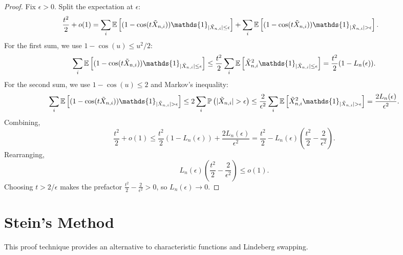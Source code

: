 \begin{proof}
	Fix $\epsilon > 0$. Split the expectation at $\epsilon$:
	\begin{align*}
		\frac{t^2}{2} + o(1)
		&= \sum_i \E\left[(1-\cos(t\tilde{X}_{n,i}))\mathds{1}_{|\tilde{X}_{n,i}|\le\epsilon}\right]
		+ \sum_i \E\left[(1-\cos(t\tilde{X}_{n,i}))\mathds{1}_{|\tilde{X}_{n,i}|>\epsilon}\right].
	\end{align*}
	For the first sum, we use $1-\cos(u) \le u^2/2$:
	\[
		\sum_i \E\left[(1-\cos(t\tilde{X}_{n,i}))\mathds{1}_{|\tilde{X}_{n,i}|\le\epsilon}\right] \le \frac{t^2}{2}\sum_i \E\left[\tilde{X}_{n,i}^2\mathds{1}_{|\tilde{X}_{n,i}|\le\epsilon}\right] = \frac{t^2}{2}(1-L_n(\epsilon)).
	\]
	For the second sum, we use $1 - \cos(u) \le 2$ and Markov's inequality:
	\[
		\sum_i \E\left[(1-\cos(t\tilde{X}_{n,i}))\mathds{1}_{|\tilde{X}_{n,i}|>\epsilon}\right] \le 2\sum_i \P\left(|\tilde{X}_{n,i}|>\epsilon\right) \le \frac{2}{\epsilon^2}\sum_i \E\left[\tilde{X}_{n,i}^2\mathds{1}_{|\tilde{X}_{n,i}|>\epsilon}\right] = \frac{2L_n(\epsilon)}{\epsilon^2}.
	\]
	Combining,
	\[
		\frac{t^2}{2} + o(1) \le \frac{t^2}{2}(1-L_n(\epsilon)) + \frac{2L_n(\epsilon)}{\epsilon^2} = \frac{t^2}{2} - L_n(\epsilon)\left(\frac{t^2}{2} - \frac{2}{\epsilon^2}\right).
	\]
	Rearranging,
	\[
		L_n(\epsilon)\left(\frac{t^2}{2} - \frac{2}{\epsilon^2}\right) \le o(1).
	\]
	Choosing $t > 2/\epsilon$ makes the prefactor $\frac{t^2}{2} - \frac{2}{\epsilon^2} > 0$, so $L_n(\epsilon) \to 0$.
\end{proof}

\section{Stein's Method}

This proof technique provides an alternative to characteristic functions and Lindeberg swapping.

